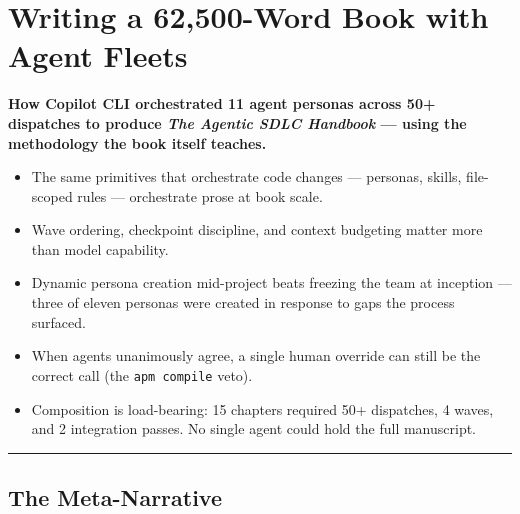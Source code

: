 \documentclass[
  a4paper,
  DIV=11,
  numbers=noendperiod]{scrreprt}
\providecommand{\tightlist}{%
  \setlength{\itemsep}{0pt}\setlength{\parskip}{0pt}}
\begin{document}
\chapter{Writing a 62,500-Word Book with Agent
Fleets}\label{writing-a-62500-word-book-with-agent-fleets}

\textbf{How Copilot CLI orchestrated 11 agent personas across 50+
dispatches to produce \emph{The Agentic SDLC Handbook} --- using the
methodology the book itself teaches.}

\begin{tcolorbox}[enhanced jigsaw, arc=.35mm, bottomrule=.15mm, bottomtitle=1mm, breakable, colback=white, colbacktitle=quarto-callout-tip-color!10!white, colframe=quarto-callout-tip-color-frame, coltitle=black, left=2mm, leftrule=.75mm, opacityback=0, opacitybacktitle=0.6, rightrule=.15mm, title=\textcolor{quarto-callout-tip-color}{\faLightbulb}\hspace{0.5em}{Key Takeaways --- The TL;DR}, titlerule=0mm, toprule=.15mm, toptitle=1mm]

\begin{itemize}
\tightlist
\item
  The same primitives that orchestrate code changes --- personas,
  skills, file-scoped rules --- orchestrate prose at book scale.
\item
  Wave ordering, checkpoint discipline, and context budgeting matter
  more than model capability.
\item
  Dynamic persona creation mid-project beats freezing the team at
  inception --- three of eleven personas were created in response to
  gaps the process surfaced.
\item
  When agents unanimously agree, a single human override can still be
  the correct call (the \texttt{apm\ compile} veto).
\item
  Composition is load-bearing: 15 chapters required 50+ dispatches, 4
  waves, and 2 integration passes. No single agent could hold the full
  manuscript.
\end{itemize}

\end{tcolorbox}

\begin{center}\rule{0.5\linewidth}{0.5pt}\end{center}

\section{The Meta-Narrative}\label{the-meta-narrative}
\end{document}
